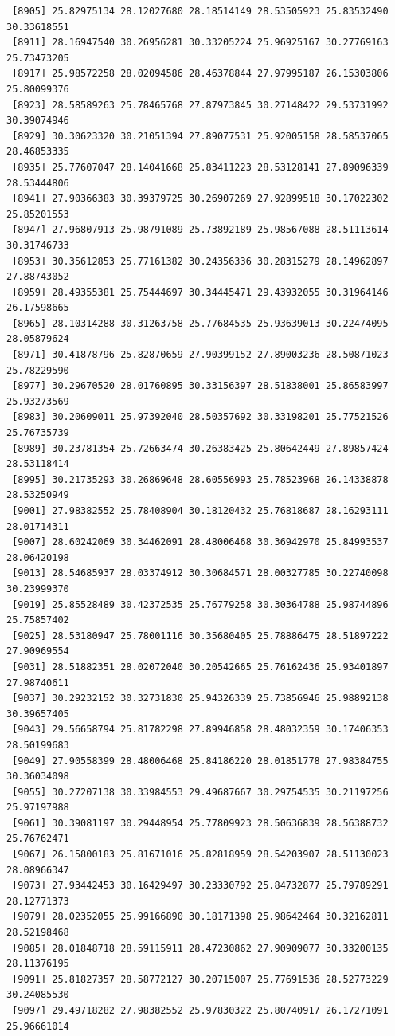 \documentclass[
  letterpaper,
  DIV=11,
  numbers=noendperiod]{scrartcl}
\begin{document}
\begin{verbatim}
 [8905] 25.82975134 28.12027680 28.18514149 28.53505923 25.83532490 30.33618551
 [8911] 28.16947540 30.26956281 30.33205224 25.96925167 30.27769163 25.73473205
 [8917] 25.98572258 28.02094586 28.46378844 27.97995187 26.15303806 25.80099376
 [8923] 28.58589263 25.78465768 27.87973845 30.27148422 29.53731992 30.39074946
 [8929] 30.30623320 30.21051394 27.89077531 25.92005158 28.58537065 28.46853335
 [8935] 25.77607047 28.14041668 25.83411223 28.53128141 27.89096339 28.53444806
 [8941] 27.90366383 30.39379725 30.26907269 27.92899518 30.17022302 25.85201553
 [8947] 27.96807913 25.98791089 25.73892189 25.98567088 28.51113614 30.31746733
 [8953] 30.35612853 25.77161382 30.24356336 30.28315279 28.14962897 27.88743052
 [8959] 28.49355381 25.75444697 30.34445471 29.43932055 30.31964146 26.17598665
 [8965] 28.10314288 30.31263758 25.77684535 25.93639013 30.22474095 28.05879624
 [8971] 30.41878796 25.82870659 27.90399152 27.89003236 28.50871023 25.78229590
 [8977] 30.29670520 28.01760895 30.33156397 28.51838001 25.86583997 25.93273569
 [8983] 30.20609011 25.97392040 28.50357692 30.33198201 25.77521526 25.76735739
 [8989] 30.23781354 25.72663474 30.26383425 25.80642449 27.89857424 28.53118414
 [8995] 30.21735293 30.26869648 28.60556993 25.78523968 26.14338878 28.53250949
 [9001] 27.98382552 25.78408904 30.18120432 25.76818687 28.16293111 28.01714311
 [9007] 28.60242069 30.34462091 28.48006468 30.36942970 25.84993537 28.06420198
 [9013] 28.54685937 28.03374912 30.30684571 28.00327785 30.22740098 30.23999370
 [9019] 25.85528489 30.42372535 25.76779258 30.30364788 25.98744896 25.75857402
 [9025] 28.53180947 25.78001116 30.35680405 25.78886475 28.51897222 27.90969554
 [9031] 28.51882351 28.02072040 30.20542665 25.76162436 25.93401897 27.98740611
 [9037] 30.29232152 30.32731830 25.94326339 25.73856946 25.98892138 30.39657405
 [9043] 29.56658794 25.81782298 27.89946858 28.48032359 30.17406353 28.50199683
 [9049] 27.90558399 28.48006468 25.84186220 28.01851778 27.98384755 30.36034098
 [9055] 30.27207138 30.33984553 29.49687667 30.29754535 30.21197256 25.97197988
 [9061] 30.39081197 30.29448954 25.77809923 28.50636839 28.56388732 25.76762471
 [9067] 26.15800183 25.81671016 25.82818959 28.54203907 28.51130023 28.08966347
 [9073] 27.93442453 30.16429497 30.23330792 25.84732877 25.79789291 28.12771373
 [9079] 28.02352055 25.99166890 30.18171398 25.98642464 30.32162811 28.52198468
 [9085] 28.01848718 28.59115911 28.47230862 27.90909077 30.33200135 28.11376195
 [9091] 25.81827357 28.58772127 30.20715007 25.77691536 28.52773229 30.24085530
 [9097] 29.49718282 27.98382552 25.97830322 25.80740917 26.17271091 25.96661014

\end{verbatim}
\end{document}
